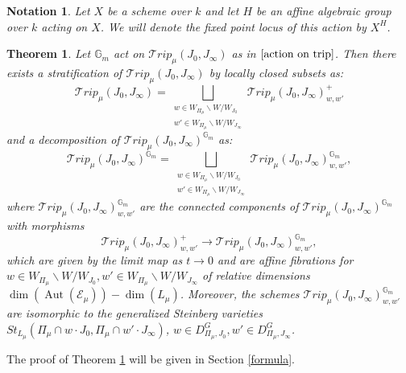 \documentclass{amsart}
\newcommand{\cE}{\mathcal{E}}
\newcommand{\gm}{\mathbb{G}_{m}}
\theoremstyle{plain}
\newtheorem{theorem}{Theorem}[section]
\newtheorem{notation}{Notation}[section]
\theoremstyle{definition}
\theoremstyle{remark}
\newtheorem{example}{Example}
\DeclareMathOperator{\aut}{Aut}
\begin{document}
\begin{notation}
Let $X$ be a scheme over $k$
and let $H$ be an affine algebraic group over $k$
acting on $X$. We will denote the fixed point locus of this action by $X^H$.
\end{notation}
\begin{theorem}\label{trip}
Let $\mathbb{G}_{m}$ act on $\mathcal{T}rip_{\mu}(J_{0},J_{\infty})$ as in $\eqref{action on trip}$. Then there exists a stratification of $\mathcal{T}rip_{\mu}(J_{0},J_{\infty})$ by locally closed subsets as:
\[
\mathcal{T}rip_{\mu}(J_{0},J_{\infty})=\displaystyle\bigsqcup_{\substack{w\in W_{\Pi_{\mu}}\backslash W/W_{J_{0}}
\\
w'\in W_{\Pi_{\mu}}\backslash W/W_{J_{\infty}}}}\mathcal{T}rip_{\mu}(J_{0},J_{\infty})_{w,w'}^{+}
\]
and a decomposition of $\mathcal{T}rip_{\mu}(J_{0},J_{\infty})^{\mathbb G_{m}}$ as:
\[
\mathcal{T}rip_{\mu}(J_{0},J_{\infty})^{\mathbb G_{m}}=\displaystyle\bigsqcup_{\substack{w\in W_{\Pi_{\mu}}\backslash W/W_{J_{0}}
\\
w'\in W_{\Pi_{\mu}}\backslash W/W_{J_{\infty}}}} \mathcal{T}rip_{\mu}(J_{0},J_{\infty})_{w,w'}^{\gm},
\]
where $\mathcal{T}rip_{\mu}(J_{0},J_{\infty})_{w,w'}^{\gm}$ are the connected components of $\mathcal{T}rip_{\mu}(J_{0},J_{\infty})^{\mathbb G_{m}}$ 
with morphisms
\[
\mathcal{T}rip_{\mu}(J_{0},J_{\infty})_{w,w'}^{+}\rightarrow\mathcal{T}rip_{\mu}(J_{0},J_{\infty})_{w,w'}^{\gm},
\]
which are given by the limit map as $t\rightarrow 0$ and are
affine fibrations for $w\in W_{\Pi_{\mu}}\backslash W/W_{J_{0}}, w'\in W_{\Pi_{\mu}}\backslash W/W_{J_{\infty}}$ of relative dimensions $\dim(\aut(\cE_{\mu}))-\dim(L_{\mu})$. Moreover, the schemes $\mathcal{T}rip_{\mu}(J_{0},J_{\infty})_{w,w'}^{\gm}$ are isomorphic to the generalized Steinberg varieties $St_{L_{\mu}}(\Pi_{\mu}\cap w\cdot J_{0},\Pi_{\mu}\cap w'\cdot J_{\infty})$, $w\in D^{G}_{\Pi_{\mu},J_{0}}, w'\in D^{G}_{\Pi_{\mu},J_{\infty}}$. %
\end{theorem}
\hspace*{-5.5mm}
The proof of Theorem \ref{trip} will be given in Section \ref{formula}. 
\end{document}
